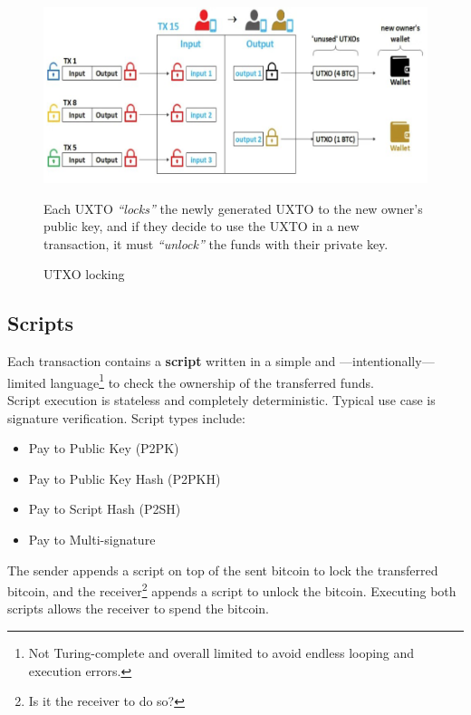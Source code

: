 \begin{figure}[htbp]
   \centering
   \includegraphics{images/bitcoin_UTXO.png}
   \caption{UTXO locking}

   Each UXTO \textit{``locks''} the newly generated UXTO to the new owner’s public key, and if they decide to use the UXTO in a new transaction, it must \textit{``unlock''} the funds with their private key.
   \label{fig:bitcoin_UTXO}
\end{figure}

\subsection{Scripts}
Each transaction contains a \textbf{script} written in a simple and ---intentionally--- limited language\footnote{Not Turing-complete and overall limited to avoid endless looping and execution errors.} to check the ownership of the transferred funds.\\
Script execution is stateless and completely deterministic.
Typical use case is signature verification.
Script types include:
\begin{itemize}
   \item Pay to Public Key (P2PK)
   \item Pay to Public Key Hash (P2PKH)
   \item Pay to Script Hash (P2SH)
   \item Pay to Multi-signature
\end{itemize}

The sender appends a script on top of the sent bitcoin to lock the transferred bitcoin, and the receiver\footnote{Is it the receiver to do so?} appends a script to unlock the bitcoin.
Executing both scripts allows the receiver to spend the bitcoin.


